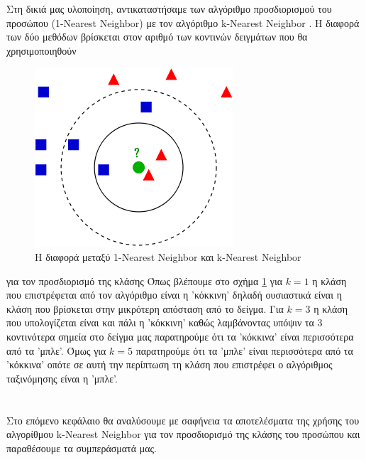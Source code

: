 Στη δικιά μας υλοποίηση, αντικαταστήσαμε των αλγόριθμο προσδιορισμού του προσώπου (1-Nearest Neighbor)
με τον αλγόριθμο k-Nearest Neighbor .
H διαφορά των δύο μεθόδων βρίσκεται στον αριθμό των κοντινών δειγμάτων που θα χρησιμοποιηθούν
\begin{figure}[htbp]
  \begin{center}
    \includegraphics[width=0.8\maxwidth]{../figures/knn.png}
      \caption{Η διαφορά μεταξύ 1-Nearest Neighbor και k-Nearest Neighbor}
      \label{fig:knn}
   \end{center}
\end{figure}

για τον προσδιορισμό της κλάσης Όπως βλέπουμε στο σχήμα \ref{fig:knn} για $k=1$
η κλάση που επιστρέφεται από τον αλγόριθμο είναι η 'κόκκινη' δηλαδή ουσιαστικά
είναι η κλάση που βρίσκεται στην μικρότερη απόσταση από το δείγμα. Για $k=3$ η κλάση
που υπολογίζεται είναι και πάλι η 'κόκκινη' καθώς λαμβάνοντας υπόψιν τα 3 κοντινότερα
σημεία στο δείγμα μας παρατηρούμε ότι τα 'κόκκινα' είναι περισσότερα από τα 'μπλε'.
Όμως για $k=5$ παρατηρούμε ότι τα 'μπλε' είναι περισσότερα από τα 'κόκκινα' οπότε
σε αυτή την περίπτωση τη κλάση που επιστρέφει ο αλγόριθμος ταξινόμησης είναι η 'μπλε'.
\paragraph{} \hspace{0em} \\
Στο επόμενο κεφάλαιο θα αναλύσουμε με σαφήνεια τα αποτελέσματα της χρήσης του
αλγορίθμου k-Nearest Neighbor για τον προσδιορισμό της κλάσης του προσώπου και
παραθέσουμε τα συμπεράσματά μας.
